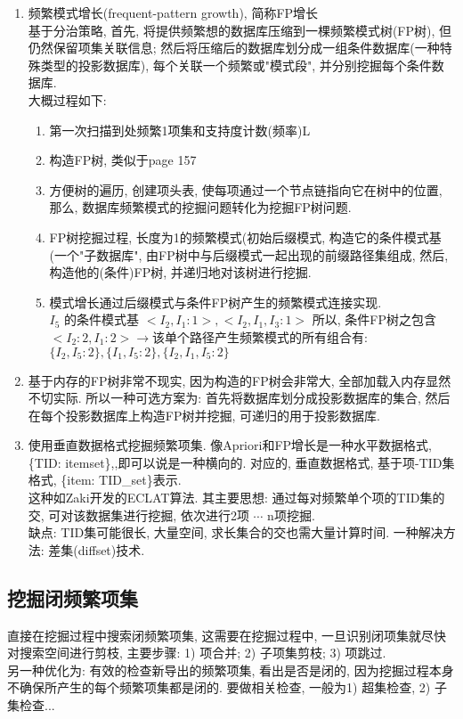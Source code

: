 \documentclass[a4paper,10pt,english]{article}
\begin{document}
\begin{enumerate}
\item {频繁模式增长(frequent-pattern growth), 简称FP增长} \\
基于分治策略, 首先, 将提供频繁想的数据库压缩到一棵频繁模式树(FP树), 但仍然保留项集关联信息; 然后将压缩后的数据库划分成一组条件数据库(一种特殊类型的投影数据库), 每个关联一个频繁或"模式段", 并分别挖掘每个条件数据库. \\
大概过程如下:
\begin{enumerate}
\item
第一次扫描到处频繁1项集和支持度计数(频率)L
\item
构造FP树, 类似于page 157
\item
方便树的遍历, 创建项头表, 使每项通过一个节点链指向它在树中的位置, 那么, 数据库频繁模式的挖掘问题转化为挖掘FP树问题.
\item
FP树挖掘过程, 长度为1的频繁模式(初始后缀模式, 构造它的条件模式基(一个"子数据库", 由FP树中与后缀模式一起出现的前缀路径集组成, 然后, 构造他的(条件)FP树, 并递归地对该树进行挖掘.
\item
模式增长通过后缀模式与条件FP树产生的频繁模式连接实现.$ I_5 \mbox{ 的条件模式基 } <I_2, I_1:1>, <I_2, I_1, I_3:1> $ 所以, 条件FP树之包含 $<I_2:2, I_1:2> \longrightarrow $该单个路径产生频繁模式的所有组合有: $\{I_2,I_5:2\}, \{I_1, I_5:2\}, \{I_2, I_1, I_5:2\}$
\end{enumerate}

\item
基于内存的FP树非常不现实, 因为构造的FP树会非常大, 全部加载入内存显然不切实际. 所以一种可选方案为: 首先将数据库划分成投影数据库的集合, 然后在每个投影数据库上构造FP树并挖掘, 可递归的用于投影数据库.

\item
使用垂直数据格式挖掘频繁项集. 像Apriori和FP增长是一种水平数据格式,\{TID: itemset\},,即可以说是一种横向的. 对应的, 垂直数据格式, 基于项-TID集格式, \{item: TID\_set\}表示.\\
这种如Zaki开发的ECLAT算法. 其主要思想: 通过每对频繁单个项的TID集的交, 可对该数据集进行挖掘, 依次进行2项 $\cdots$ n项挖掘. \\
缺点: TID集可能很长, 大量空间, 求长集合的交也需大量计算时间. 一种解决方法: 差集(diffset)技术. 
\end{enumerate}

\subsection{挖掘闭频繁项集}
直接在挖掘过程中搜索闭频繁项集, 这需要在挖掘过程中, 一旦识别闭项集就尽快对搜索空间进行剪枝, 主要步骤: 1) 项合并; 2) 子项集剪枝; 3) 项跳过. \\
另一种优化为: 有效的检查新导出的频繁项集, 看出是否是闭的, 因为挖掘过程本身不确保所产生的每个频繁项集都是闭的. 要做相关检查, 一般为1) 超集检查, 2) 子集检查...
\end{document}

